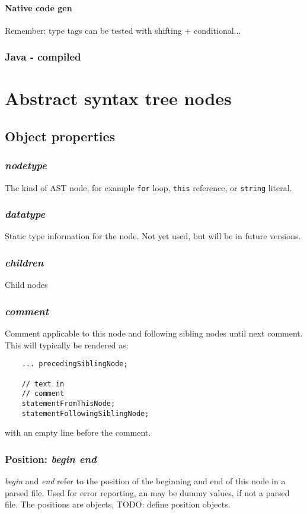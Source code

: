 \documentclass[10pt]{article}
\newcommand{\n}[1]{{\tt #1}}
\newcommand{\p}[1]{{\em #1}}
\begin{document}
\paragraph{Native code gen}
Remember: type tags can be tested with shifting + conditional...

\subsubsection{Java - compiled}
\section{Abstract syntax tree nodes}
\subsection{Object properties}
\subsubsection{\em nodetype}
The kind of AST node, for example \n{for} loop, \n{this} reference, or \n{string} literal. 
\subsubsection{\em datatype}
Static type information for the node. Not yet used, but will be in future versions.
\subsubsection{\em children}
Child nodes 
\subsubsection{\em comment}
Comment applicable to this node and following sibling nodes until next comment. This will typically be rendered as:
\begin{verbatim}
    ... precedingSiblingNode;

    // text in
    // comment
    statementFromThisNode;
    statementFollowingSiblingNode;
\end{verbatim}
with an empty line before the comment.

\subsubsection{Position: \em begin end}
\p{begin} and \p{end} refer to the position of the beginning and end of this node in a parsed file. Used for error reporting, an may be dummy values, if not a parsed file.
The positions are objects, TODO: define position objects.
\end{document}

